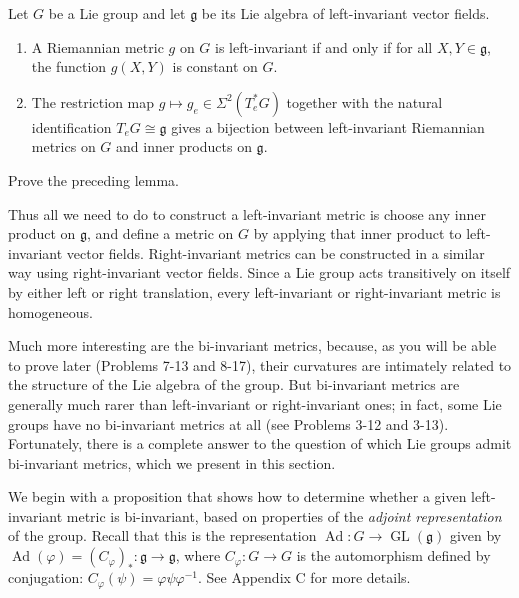 \begin{lemma}
\label{lem:left-invariant-metrics-lie-group}
Let $G$ be a Lie group and let $\mathfrak{g}$ be its Lie algebra of left-invariant vector fields.

\begin{enumerate}[label=(\alph*)]
\item A Riemannian metric $g$ on $G$ is left-invariant if and only if for all $X, Y \in \mathfrak{g}$, the function $g(X,Y)$ is constant on $G$.
\item The restriction map $g \mapsto g_e \in \Sigma^2 (T_e^* G)$ together with the natural identification $T_e G \cong \mathfrak{g}$ gives a bijection between left-invariant Riemannian metrics on $G$ and inner products on $\mathfrak{g}$.
\end{enumerate}
\end{lemma}

\begin{exercise}
\label{exer:prove-preceding-lemma}
Prove the preceding lemma.
\end{exercise}

Thus all we need to do to construct a left-invariant metric is choose any inner product on $\mathfrak{g}$, and define a metric on $G$ by applying that inner product to left-invariant vector fields. Right-invariant metrics can be constructed in a similar way using right-invariant vector fields. Since a Lie group acts transitively on itself by either left or right translation, every left-invariant or right-invariant metric is homogeneous.

Much more interesting are the bi-invariant metrics, because, as you will be able to prove later (Problems 7-13 and 8-17), their curvatures are intimately related to the structure of the Lie algebra of the group. But bi-invariant metrics are generally much rarer than left-invariant or right-invariant ones; in fact, some Lie groups have no bi-invariant metrics at all (see Problems 3-12 and 3-13). Fortunately, there is a complete answer to the question of which Lie groups admit bi-invariant metrics, which we present in this section.

We begin with a proposition that shows how to determine whether a given left-invariant metric is bi-invariant, based on properties of the \emph{adjoint representation} of
the group. Recall that this is the representation $\operatorname{Ad}: G \to \operatorname{GL}(\mathfrak{g})$ given by $\operatorname{Ad}(\varphi) = (C_\varphi)_* : \mathfrak{g} \to \mathfrak{g}$, where $C_\varphi : G \to G$ is the automorphism defined by conjugation: $C_\varphi(\psi) = \varphi\psi\varphi^{-1}$. See Appendix C for more details.

